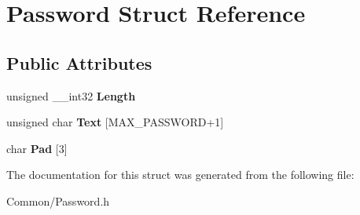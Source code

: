 \hypertarget{struct_password}{}\section{Password Struct Reference}
\label{struct_password}
\subsection*{Public Attributes}
\begin{DoxyCompactItemize}
\item 
\mbox{\label{struct_password_a93d3c78f784f07daa31e1cdb87ea3535}} 
unsigned \+\_\+\+\_\+int32 {\bfseries Length}
\item 
\mbox{\label{struct_password_aff9b767575e3d6c60561fa31ef233527}} 
unsigned char {\bfseries Text} \mbox{[}M\+A\+X\+\_\+\+P\+A\+S\+S\+W\+O\+RD+1\mbox{]}
\item 
\mbox{\label{struct_password_aef993214007e09c8b62354ed835cb33d}} 
char {\bfseries Pad} \mbox{[}3\mbox{]}
\end{DoxyCompactItemize}


The documentation for this struct was generated from the following file\+:\begin{DoxyCompactItemize}
\item 
Common/Password.\+h\end{DoxyCompactItemize}
